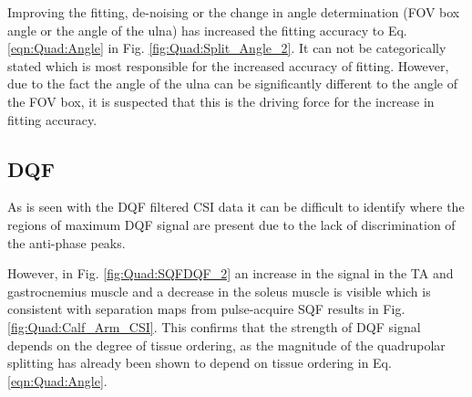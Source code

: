 
Improving the fitting, de-noising  or the change in angle determination (\ac{FOV} box angle or the angle of the ulna) has increased the fitting accuracy to Eq. \ref{eqn:Quad:Angle} in Fig. \ref{fig:Quad:Split_Angle_2}. It can not be categorically stated which is most responsible for the increased accuracy of fitting. However, due to the fact the angle of the ulna can be significantly different to the angle of the \ac{FOV} box, it is suspected that this is the driving force for the increase in fitting accuracy.

\subsection{DQF}

As is seen with the \ac{DQF} filtered \ac{CSI} data it can be difficult to identify where the regions of maximum \ac{DQF} signal are present due to the lack of discrimination of the anti-phase peaks. 

However, in Fig. \ref{fig:Quad:SQFDQF_2} an increase in the signal in the \ac{TA} and gastrocnemius muscle and a decrease in the soleus muscle is visible which is consistent with separation maps from pulse-acquire \ac{SQF} results in Fig. \ref{fig:Quad:Calf_Arm_CSI}. This confirms that the strength of \ac{DQF} signal depends on the degree of tissue ordering, as the magnitude of the quadrupolar splitting has already been shown to depend on tissue ordering in Eq. \ref{eqn:Quad:Angle}. 




